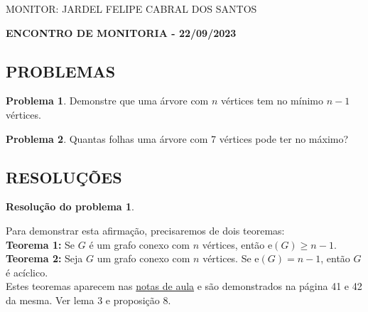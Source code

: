 \documentclass[12pt, a4paper]{article}
\theoremstyle{definition} \newtheorem{prob}{Problema}
\newtheorem{res}{Resolução do problema}
\theoremstyle{plain} \newtheorem*{teo}{Teorema}
\begin{document}
\begin{flushleft}

MONITOR: JARDEL FELIPE CABRAL DOS SANTOS\\[0.75cm] 
\end{flushleft}

\begin{center} \textbf{ENCONTRO DE MONITORIA - 22/09/2023\\[0.75cm]}
\end{center}

\begin{center}
\section*{\normalsize PROBLEMAS\\[0.25cm]} 
\end{center}

\begin{prob}
Demonstre que uma árvore com \(n\) vértices tem no mínimo \(n-1\) vértices.
\end{prob}

\begin{prob}
Quantas folhas uma árvore com 7 vértices pode ter no máximo?
\end{prob}

\newpage

\begin{center}
\section*{\normalsize RESOLUÇÕES\\[0.25cm]}
\end{center}

\begin{res} %
\end{res}

Para demonstrar esta afirmação, precisaremos de dois teoremas: \\

\textbf{Teorema 1:} Se \(G\) é um grafo conexo com \(n\) vértices, então \(\mathrm{e}(G) \geq n-1\). \\

\textbf{Teorema 2:} Seja \(G\) um grafo conexo com \(n\) vértices. Se \(\mathrm{e}(G) = n-1\), então \(G\) é acíclico. \\

Estes teoremas aparecem nas \href{https://drive.google.com/file/d/16Gy9vck48p64A-3u1t2-uUVGOVqOlAOg/view}{notas de aula} e são demonstrados na página 41 e 42 da mesma. Ver lema 3 e proposição 8. \\
\end{document}
